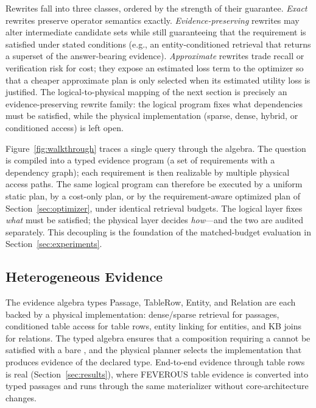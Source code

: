 Rewrites fall into three classes, ordered by the strength of their guarantee.
\emph{Exact} rewrites preserve operator semantics exactly. \emph{Evidence-preserving}
rewrites may alter intermediate candidate sets while still guaranteeing that the
requirement is satisfied under stated conditions (e.g., an entity-conditioned
retrieval that returns a superset of the answer-bearing evidence). \emph{Approximate}
rewrites trade recall or verification risk for cost; they expose an estimated
loss term to the optimizer so that a cheaper approximate plan is only selected
when its estimated utility loss is justified. The logical-to-physical mapping
of the next section is precisely an evidence-preserving rewrite family: the
logical program fixes what dependencies must be satisfied, while the physical
implementation (sparse, dense, hybrid, or conditioned access) is left open.

Figure~\ref{fig:walkthrough} traces a single query through the algebra. The
question is compiled into a typed evidence program (a set of requirements with
a dependency graph); each requirement is then realizable by multiple physical
access paths. The same logical program can therefore be executed by a uniform
static plan, by a cost-only plan, or by the requirement-aware optimized plan of
Section~\ref{sec:optimizer}, under identical retrieval budgets. The logical
layer fixes \emph{what} must be satisfied; the physical layer decides
\emph{how}---and the two are audited separately. This decoupling is the
foundation of the matched-budget evaluation in Section~\ref{sec:experiments}.

\subsection{Heterogeneous Evidence}
\label{sec:heterogeneous}

The evidence algebra types Passage, TableRow, Entity, and Relation are each
backed by a physical implementation: dense/sparse retrieval for passages,
conditioned table access for table rows, entity linking for entities, and KB
joins for relations. The typed algebra ensures that a composition requiring a
 cannot be satisfied with a bare , and the
physical planner selects the implementation that produces evidence of the
declared type. End-to-end evidence through table rows is real (Section~\ref{sec:results}),
where FEVEROUS table evidence is converted into typed 
passages and runs through the same materializer without core-architecture
changes.

